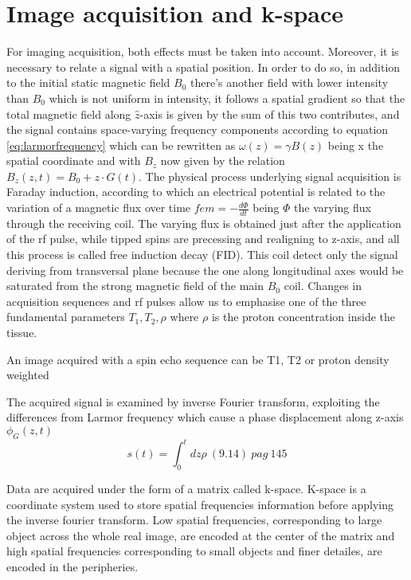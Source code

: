 \documentclass[12pt]{report}
\begin{document}
\section{Image acquisition and k-space}
For imaging acquisition, both effects must be taken into account. Moreover, it is necessary to relate a signal with a spatial position.
In order to do so, in addition to the initial static magnetic field $B_0$ there's another field with lower intensity than $B_0$ which is not uniform in intensity, it follows a spatial gradient so that the total magnetic field along $\hat z$-axis is given by the sum of this two contributes, and the signal contains space-varying frequency components according to equation \ref{eq:larmorfrequency} which can be rewritten as $\omega(z) = \gamma B(z)$ being x the spatial coordinate and with $B_z$ now given by the relation $B_z(z, t) = B_0 + z\cdot G(t)$.
The physical process underlying signal acquisition is Faraday induction, according to which an electrical potential is related to the variation of a magnetic flux over time $fem = -\frac{d\Phi}{dt}$ being $\Phi$ the varying flux through the receiving coil.
The varying flux is obtained just after the application of the rf pulse, while tipped spins are precessing and realigning to z-axis, and all this process is called free induction decay (FID). This coil detect only the signal deriving from transversal plane because the one along longitudinal axes would be saturated from the strong magnetic field of the main $B_0$ coil. Changes in acquisition sequences and rf pulses allow us to emphasise one of the three fundamental parameters $T_1, T_2, \rho$ where $\rho$ is the proton concentration inside the tissue.

An image acquired with a spin echo sequence can be T1, T2 or proton density weighted

The acquired signal is examined by inverse Fourier transform, exploiting the differences from Larmor frequency which cause a phase displacement along z-axis $\phi_G(z, t)$
\begin{equation}
s(t) = \int_0^tdz\rho \ (9.14) \ pag \ 145
\end{equation}

Data are acquired under the form of a matrix called k-space.
K-space is a coordinate system used to store spatial frequencies information before applying the inverse fourier transform.
Low spatial frequencies, corresponding to large object across the whole real image, are encoded at the center of the matrix and high spatial frequencies corresponding to small objects and finer detailes, are encoded in the peripheries.
\end{document}
